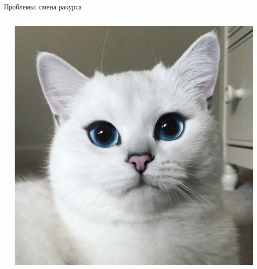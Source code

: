 \documentclass[aspectratio=169, professionalfonts]{beamer}
\begin{document}
\begin{frame}{Проблемы: смена ракурса}
\begin{columns}
\begin{column}{.325\linewidth}
        \end{column}
        \begin{column}{.325\linewidth}
            \centering
            \includegraphics[width=\linewidth]{graphs/fig11_3.jpg}
        \end{column}
    \end{columns}
\end{frame}
\end{document}
